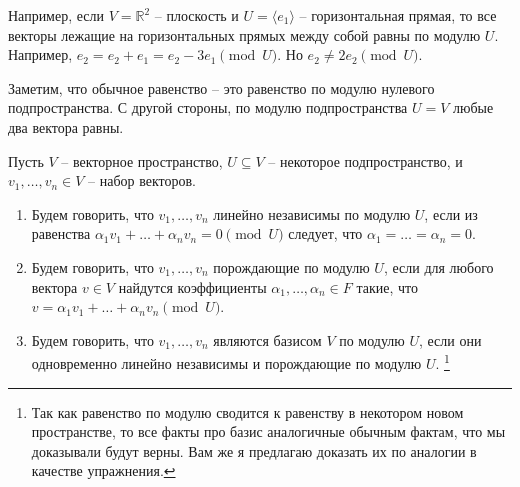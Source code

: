 Например, если $V = \mathbb R^2$ -- плоскость и $U = \langle e_1\rangle$ -- горизонтальная прямая, то все векторы лежащие на горизонтальных прямых между собой равны по модулю $U$.
Например, $e_2 = e_2 + e_1 = e_2 - 3 e_1 \pmod U$.
Но $e_2 \neq 2 e_2 \pmod U$.

Заметим, что обычное равенство -- это равенство по модулю нулевого подпространства.
С другой стороны, по модулю подпространства $U = V$ любые два вектора равны.

\begin{definition}
Пусть $V$ -- векторное пространство,  $U\subseteq V$ -- некоторое подпространство, и $v_1,\ldots,v_n\in V$ -- набор векторов.
\begin{enumerate}
\item Будем говорить, что $v_1,\ldots,v_n$ линейно независимы по модулю $U$, если из равенства $\alpha_1 v_1 + \ldots + \alpha_n v_n = 0 \pmod U$ следует, что $\alpha_1 = \ldots = \alpha_ n = 0$.

\item Будем говорить, что $v_1, \ldots, v_n$ порождающие по модулю $U$, если для любого вектора $v\in V$ найдутся коэффициенты $\alpha_1,\ldots,\alpha_n\in F$ такие, что $v = \alpha_1 v_1 + \ldots + \alpha_n v_n\pmod U$.

\item Будем говорить, что $v_1,\ldots,v_n$ являются базисом $V$ по модулю $U$, если они одновременно линейно независимы и порождающие по модулю $U$.%
\footnote{Так как равенство по модулю сводится к равенству в некотором новом пространстве, то все факты про базис аналогичные обычным фактам, что мы доказывали будут верны.
Вам же я предлагаю доказать их по аналогии в качестве упражнения.}
\end{enumerate}
\end{definition}


